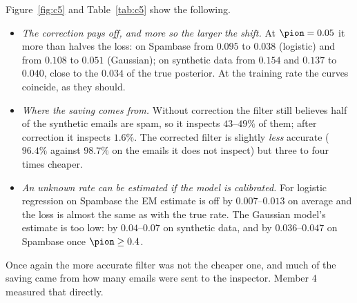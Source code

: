 \begin{table}[!htbp]
\centering\footnotesize

\caption{Spambase: realized loss after the spam rate changes to $\pion$ (training rate $0.394$),
without correction, corrected with the known $\pion$, and corrected with the EM estimate
(mean $\pm$ standard error, 20 splits).}
\label{tab:c5}
\end{table}

Figure~\ref{fig:c5} and Table~\ref{tab:c5} show the following.
\begin{itemize}
  \item \emph{The correction pays off, and more so the larger the shift.} At $\pion=0.05$ it more than
        halves the loss: on Spambase from $0.095$ to $0.038$ (logistic) and from $0.108$ to $0.051$
        (Gaussian); on synthetic data from $0.154$ and $0.137$ to $0.040$, close to the $0.034$ of the
        true posterior. At the training rate the curves coincide, as they should.
  \item \emph{Where the saving comes from.} Without correction the filter still believes half of the
        synthetic emails are spam, so it inspects $43$--$49\%$ of them; after correction it inspects
        $1.6\%$. The corrected filter is slightly \emph{less} accurate ($96.4\%$ against $98.7\%$ on the
        emails it does not inspect) but three to four times cheaper.
  \item \emph{An unknown rate can be estimated if the model is calibrated.} For logistic regression on
        Spambase the EM estimate is off by $0.007$--$0.013$ on average and the loss is almost the same as
        with the true rate. The Gaussian model's estimate is too low: by $0.04$--$0.07$ on synthetic data,
        and by $0.036$--$0.047$ on Spambase once $\pion\ge0.4$.
\end{itemize}
Once again the more accurate filter was not the cheaper one, and much of the saving came from how
many emails were sent to the inspector. Member 4 measured that directly.
